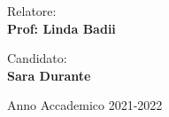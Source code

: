 \begin{titlepage}
\begin{minipage}[t]{0.47\textwidth}
	{\large{Relatore:}{\normalsize\vspace{3mm}
    \bf\\ \large{Prof: Linda Badii} \normalsize\vspace{3mm}\bf}}
\end{minipage}
\hfill
\begin{minipage}[t]{0.47\textwidth}\raggedleft
	{\large{Candidato:}{\normalsize\vspace{3mm} \bf\\ \large{Sara Durante}}}
\end{minipage}

\vspace{10mm}

\begin{center}
    {\large{Anno Accademico 2021-2022}}
\end{center}

\vspace{30mm}

\end{titlepage}
